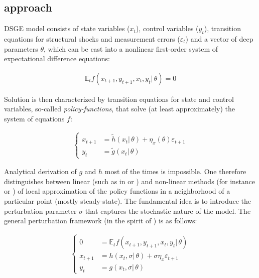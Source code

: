 \documentclass{pracamgr}
\numberwithin{equation}{section}
\begin{document}
\subsection{\citet{klein2000using} approach}

DSGE model consists of state variables ($x_{t}$), control variables ($y_{t}$), transition equations for structural shocks and measurement errors ($\varepsilon_{t}$) and a vector of deep parameters $\theta$, which can be cast into a nonlinear first-order system of expectational difference equations:

\begin{align}
\mathbb{E}_{t}f\left(x_{t+1},y_{t+1},x_{t},y_{t} | \, \theta \right) = 0
\end{align}

Solution is then characterized by transition equations for state and control variables, so-called \textit{policy-functions}, that solve (at least approximately) the system of equations $f$:

\begin{align}
\left\{
\begin{array}{cl}
x_{t+1} &= \widetilde{h} \left( x_{t} | \, \theta \right) + \eta_{x} \left( \theta \right) \varepsilon_{t+1} \\
y_{t} &= \widetilde{g} \left( x_{t} | \, \theta \right)
\end{array}
\right.
\end{align}

Analytical derivation of $g$ and $h$ most of the times is impossible. One therefore distinguishes between linear (such as in \citet{klein2000using} or \citet{sims2002solving}) and non-linear methods (for instance \citet{schmitt2004solving} or \citet{gomme2011second}) of local approximation of the policy functions in a neighborhood of a particular point (mostly steady-state). The fundamental idea is to introduce the perturbation parameter $\sigma$ that captures the stochastic nature of the model. The general perturbation framework (in the spirit of \citet{schmitt2004solving}) is as follows:

\begin{align}
\left\{
\begin{array}{cl}
0 &= \mathbb{E}_{t}f\left(x_{t+1},y_{t+1},x_{t},y_{t} | \, \theta \right) \\
x_{t+1} &= h \left( x_{t}, \sigma | \, \theta \right) + \sigma \eta_{x} \varepsilon_{t+1} \\
y_{t} &= g \left( x_{t}, \sigma | \, \theta \right)
\end{array}
\right.
\end{align}
\end{document}
